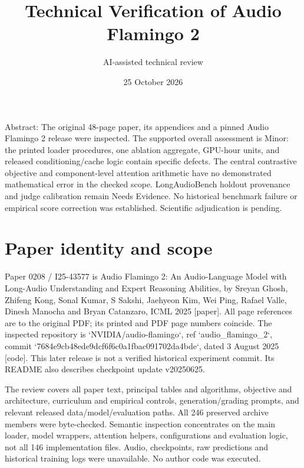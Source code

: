 \documentclass[10pt]{article}
\title{Technical Verification of Audio Flamingo 2}
\author{AI-assisted technical review}
\date{25 October 2026}
\begin{document}
\maketitle
Abstract: The original 48-page paper, its appendices and a pinned Audio Flamingo 2 release were inspected. The supported overall assessment is Minor: the printed loader procedures, one ablation aggregate, GPU-hour units, and released conditioning/cache logic contain specific defects. The central contrastive objective and component-level attention arithmetic have no demonstrated mathematical error in the checked scope. LongAudioBench holdout provenance and judge calibration remain Needs Evidence. No historical benchmark failure or empirical score correction was established. Scientific adjudication is pending.\par
\section*{Paper identity and scope}
Paper 0208 / I25-43577 is Audio Flamingo 2: An Audio-Language Model with Long-Audio Understanding and Expert Reasoning Abilities, by Sreyan Ghosh, Zhifeng Kong, Sonal Kumar, S Sakshi, Jaehyeon Kim, Wei Ping, Rafael Valle, Dinesh Manocha and Bryan Catanzaro, ICML 2025 [paper]. All page references are to the original PDF; its printed and PDF page numbers coincide. The inspected repository is `NVIDIA/audio-flamingo`, ref `audio\_flamingo\_2`, commit `7684e9cb48ede9dcf6f6c0a1fbac091702da4bde`, dated 3 August 2025 [code]. This later release is not a verified historical experiment commit. Its README also describes checkpoint update v20250625.\par
The review covers all paper text, principal tables and algorithms, objective and architecture, curriculum and empirical controls, generation/grading prompts, and relevant released data/model/evaluation paths. All 246 preserved archive members were byte-checked. Semantic inspection concentrates on the main loader, model wrappers, attention helpers, configurations and evaluation logic, not all 146 implementation files. Audio, checkpoints, raw predictions and historical training logs were unavailable. No author code was executed.\par
\end{document}
